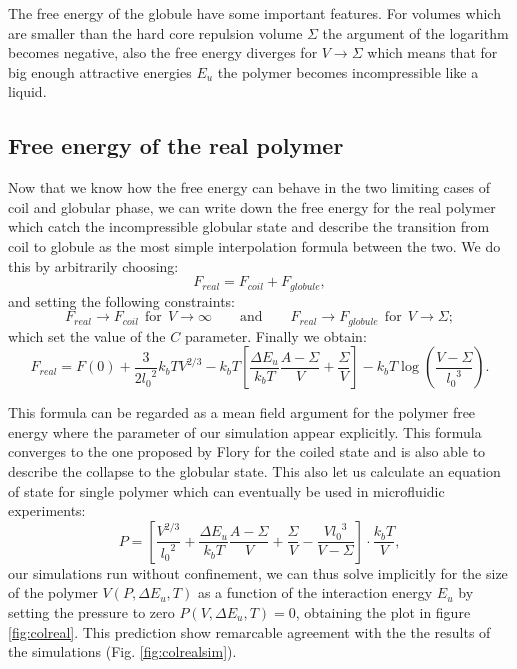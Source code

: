\documentclass[12pt,a4paper,notitlepage]{article}
\begin{document}
The free energy of the globule have some important features. For
volumes which are smaller than the hard core repulsion volume $\Sigma$
the argument of the logarithm becomes negative, also the free energy
diverges for $V \to \Sigma$ which means that for big enough attractive
energies $E_u$ the polymer becomes incompressible like a liquid.

\subsection{Free energy of the real polymer}

Now that we know how the free energy can behave in the two limiting
cases of coil and globular phase, we can write down the free energy
for the real polymer which catch the incompressible globular state and
describe the transition from coil to globule as the most simple
interpolation formula between the two. We do this by arbitrarily
choosing:
\begin{equation}
  F_{real} = F_{coil} + F_{globule},
\end{equation}
and setting the following constraints:
\begin{equation}
  F_{real} \to F_{coil} \ \ \mathrm{for}\ \ V \to \infty
  \qquad \mathrm{and} \qquad
  F_{real} \to F_{globule} \ \ \mathrm{for}\ \ V \to \Sigma;
\end{equation}
which set the value of the $C$ parameter. Finally we obtain:
\begin{equation}
  F_{real} = F(0) + \frac{3}{2 {l_0}^2} k_bT V^{2/3}
  - k_b T \left[ \frac{\Delta E_u}{k_b T} \frac{A - \Sigma}{V}
  + \frac{\Sigma}{V} \right]
  - k_b T \log \left(\frac{V - \Sigma}{{l_0}^3} \right).
\label{eq:enreal}
\end{equation}

This formula can be regarded as a mean field argument for the polymer
free energy where the parameter of our simulation appear
explicitly. This formula converges to the one proposed by Flory for
the coiled state and is also able to describe the collapse to the
globular state. This also let us calculate an equation of state for
single polymer which can eventually be used in microfluidic experiments:
\begin{equation}
  P = \left[ \frac{V^{2/3}}{{l_0}^2} +
    \frac{\Delta E_u}{k_bT} \frac{A - \Sigma}{V} + 
    \frac{\Sigma}{V} - \frac{V {l_0}^3}{V - \Sigma}
  \right] \cdot \frac{k_b T}{V},
\label{eq:realestate}
\end{equation}
our simulations run without confinement, we can thus solve implicitly
for the size of the polymer $V(P,\Delta E_u,T)$ as a function of the
interaction energy $E_u$ by setting the pressure to zero
$P(V, \Delta E_u, T) = 0$, obtaining the plot in figure
\ref{fig:colreal}. This prediction show remarcable agreement with the 
the results of the simulations (Fig. \ref{fig:colrealsim}).
\end{document}
